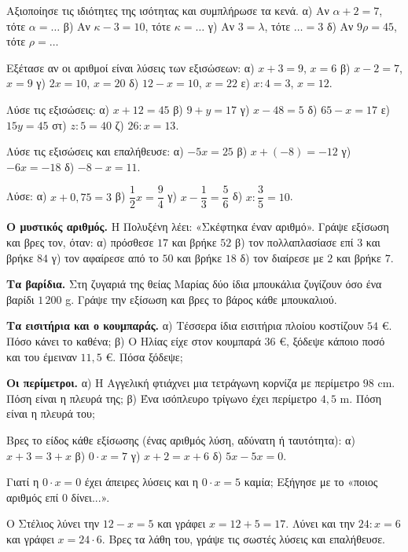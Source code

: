 \ex Αξιοποίησε τις ιδιότητες της ισότητας και συμπλήρωσε τα κενά. α) Αν $\alpha+2=7$, τότε $\alpha=\dots$ \quad β) Αν $\kappa-3=10$, τότε $\kappa=\dots$ \quad γ) Αν $3=\lambda$, τότε $\dots=3$ \quad δ) Αν $9\rho=45$, τότε $\rho=\dots$

\ex Εξέτασε αν οι αριθμοί είναι λύσεις των εξισώσεων: α) $x+3=9$, $x=6$ \quad β) $x-2=7$, $x=9$ \quad γ) $2x=10$, $x=20$ \quad δ) $12-x=10$, $x=22$ \quad ε) $x:4=3$, $x=12$.

\ex Λύσε τις εξισώσεις: α) $x+12=45$ \quad β) $9+y=17$ \quad γ) $x-48=5$ \quad δ) $65-x=17$ \quad ε) $15y=45$ \quad στ) $z:5=40$ \quad ζ) $26:x=13$.

\ex Λύσε τις εξισώσεις και επαλήθευσε: α) $-5x=25$ \quad β) $x+(-8)=-12$ \quad γ) $-6x=-18$ \quad δ) $-8-x=11$.

\ex Λύσε: α) $x+0{,}75=3$ \quad β) $\dfrac{1}{2}x=\dfrac{9}{4}$ \quad γ) $x-\dfrac{1}{3}=\dfrac{5}{6}$ \quad δ) $x:\dfrac{3}{5}=10$.


\ex \textbf{Ο μυστικός αριθμός.} Η Πολυξένη λέει: «Σκέφτηκα έναν αριθμό». Γράψε εξίσωση και βρες τον, όταν: α) πρόσθεσε $17$ και βρήκε $52$ \quad β) τον πολλαπλασίασε επί $3$ και βρήκε $84$ \quad γ) τον αφαίρεσε από το $50$ και βρήκε $18$ \quad δ) τον διαίρεσε με $2$ και βρήκε $7$.

\ex \textbf{Τα βαρίδια.} Στη ζυγαριά της θείας Μαρίας δύο ίδια μπουκάλια ζυγίζουν όσο ένα βαρίδι $1\,200$ g. Γράψε την εξίσωση και βρες το βάρος κάθε μπουκαλιού.

\ex \textbf{Τα εισιτήρια και ο κουμπαράς.} α) Τέσσερα ίδια εισιτήρια πλοίου κοστίζουν $54$ €. Πόσο κάνει το καθένα; β) Ο Ηλίας είχε στον κουμπαρά $36$ €, ξόδεψε κάποιο ποσό και του έμειναν $11{,}5$ €. Πόσα ξόδεψε;

\ex \textbf{Οι περίμετροι.} α) Η Αγγελική φτιάχνει μια τετράγωνη κορνίζα με περίμετρο $98$ cm. Πόση είναι η πλευρά της; β) Ένα ισόπλευρο τρίγωνο έχει περίμετρο $4{,}5$ m. Πόση είναι η πλευρά του;

\ex Βρες το είδος κάθε εξίσωσης (ένας αριθμός λύση, αδύνατη ή ταυτότητα): α) $x+3=3+x$ \quad β) $0\cdot x=7$ \quad γ) $x+2=x+6$ \quad δ) $5x-5x=0$.


\ex Γιατί η $0\cdot x=0$ έχει άπειρες λύσεις και η $0\cdot x=5$ καμία; Εξήγησε με το «ποιος αριθμός επί $0$ δίνει...».

\ex Ο Στέλιος λύνει την $12-x=5$ και γράφει $x=12+5=17$. Λύνει και την $24:x=6$ και γράφει $x=24\cdot6$. Βρες τα λάθη του, γράψε τις σωστές λύσεις και επαλήθευσε.

